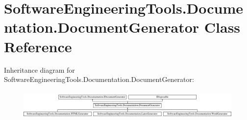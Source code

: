\hypertarget{class_software_engineering_tools_1_1_documentation_1_1_document_generator}{\section{Software\+Engineering\+Tools.\+Documentation.\+Document\+Generator Class Reference}
\label{class_software_engineering_tools_1_1_documentation_1_1_document_generator}
}
Inheritance diagram for Software\+Engineering\+Tools.\+Documentation.\+Document\+Generator\+:\begin{figure}[H]
\begin{center}
\leavevmode
\includegraphics[height=1.493333cm]{class_software_engineering_tools_1_1_documentation_1_1_document_generator}
\end{center}
\end{figure}
